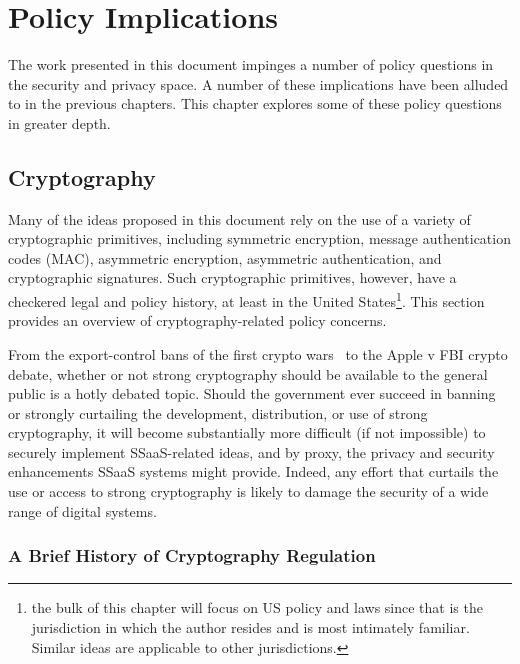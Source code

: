 \chapter{Policy Implications}
\label{chap:policy}

The work presented in this document impinges a number of policy
questions in the security and privacy space. A number of these
implications have been alluded to in the previous chapters. This
chapter explores some of these policy questions in greater depth.

\section{Cryptography}
\label{chap:policy:crypto}

Many of the ideas proposed in this document rely on the use of a
variety of cryptographic primitives, including symmetric encryption,
message authentication codes (MAC), asymmetric encryption, asymmetric
authentication, and cryptographic signatures. Such cryptographic
primitives, however, have a checkered legal and policy history, at
least in the United States\footnote{the bulk of this chapter will
  focus on US policy and laws since that is the jurisdiction in which
  the author resides and is most intimately familiar. Similar ideas
  are applicable to other jurisdictions.}. This section provides an
overview of cryptography-related policy concerns.

From the export-control bans of the first crypto wars~\cite{kehl2015}
to the Apple v FBI crypto debate, whether or not strong cryptography
should be available to the general public is a hotly debated
topic. Should the government ever succeed in banning or strongly
curtailing the development, distribution, or use of strong
cryptography, it will become substantially more difficult (if not
impossible) to securely implement SSaaS-related ideas, and by proxy,
the privacy and security enhancements SSaaS systems might
provide. Indeed, any effort that curtails the use or access to strong
cryptography is likely to damage the security of a wide range of digital
systems.

\subsection{A Brief History of Cryptography Regulation}

